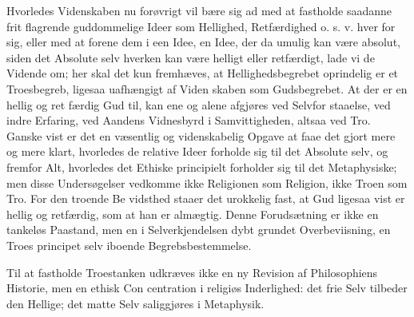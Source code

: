 \documentclass[12pt]{book}
\newcommand{\opage}[1]{\marginnote{\footnotesize\textit{[#1]}}}
\begin{document}
Hvorledes Videnskaben nu forøvrigt vil bære sig ad
med at fastholde saadanne frit flagrende guddommelige
Ideer som Hellighed, Retfærdighed o. s. v. hver for
sig, eller med at forene dem i een Idee, en Idee,
der da umulig kan være absolut, siden det Absolute selv
hverken kan være helligt eller retfærdigt, lade vi de Vidende
om; her skal det kun fremhæves, at Hellighedsbegrebet
oprindelig er et Troesbegreb, ligesaa uafhængigt af Viden\-%
skaben som Gudsbegrebet. At der er en hellig og ret\-%
færdig Gud til, kan ene og alene afgjøres ved Selvfor\-%
staaelse, ved indre Erfaring, ved Aandens Vidnesbyrd i
\opage{113}\setcounter{footnote}{0}%
Samvittigheden, altsaa ved Tro. Ganske vist er det en
væsentlig og videnskabelig Opgave at faae det gjort
mere og mere klart, hvorledes de relative Ideer forholde
sig til det Absolute selv, og fremfor Alt, hvorledes det
Ethiske principielt forholder sig til det Metaphysiske;
men disse Undersøgelser vedkomme ikke Religionen som
Religion, ikke Troen som Tro. For den troende Be\-%
vidsthed staaer det urokkelig fast, at Gud ligesaa vist er
hellig og retfærdig, som at han er almægtig. Denne
Forudsætning er ikke en tankeløs Paastand, men en i
Selverkjendelsen dybt grundet Overbeviisning, en Troes\-%
principet selv iboende Begrebsbestemmelse.

Til at fastholde Troestanken udkræves ikke en ny
Revision af Philosophiens Historie, men en ethisk Con\-%
centration i religiøs Inderlighed: det frie Selv tilbeder
den Hellige; det matte Selv saliggjøres i Metaphysik.
\end{document}
